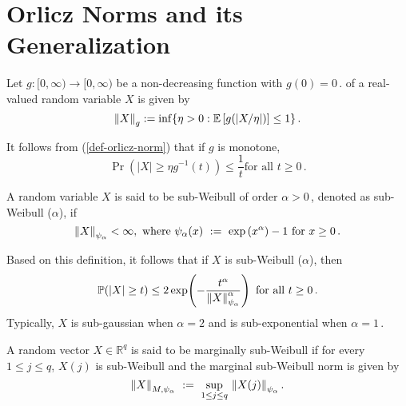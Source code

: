 \documentclass[12pt]{article}
\begin{document}
\section{Orlicz Norms and its Generalization}
\begin{definition}
  Let $g:[0, \infty) \rightarrow [0, \infty)$ be a non-decreasing function
  with $g(0) = 0\,.$ of a real-valued random variable $X$ is given by
  \begin{equation}\label{def-orlicz-norm}
    \left\lVert X \right\rVert_g := \inf\{\eta > 0: \mathbb{E}\left[g(\vert X /\eta
    \vert) \right] \le 1\}\,.
  \end{equation}
\end{definition}

It follows from (\ref{def-orlicz-norm}) that if $g$ is monotone,
\begin{equation} \nonumber
  \Pr\!\left(\vert X \vert \ge \eta g^{-1}(t) \right) \le \dfrac{1}{t} \text{
  for all } t \ge 0\,.
\end{equation}

\begin{definition}
  A random variable $X$ is said to be sub-Weibull of order $\alpha > 0\,$,
  denoted as sub-Weibull ($\alpha$), if
  \begin{equation} \label{def-sub-weibull}
    \left\lVert X\right\rVert_{\psi_\alpha} < \infty, \text{ where } \psi_\alpha(x) ~:=~
    \exp\left(x^\alpha \right) - 1 \text{  for } x \ge 0\,.
  \end{equation}
\end{definition}
Based on this definition, it follows that if $X$ is sub-Weibull ($\alpha$), then
\begin{equation}\nonumber
  \mathbb{P}\!\left(\vert X \vert \ge t \right) \le 2 \exp\!\left(-
  \dfrac{t^\alpha}{\left\lVert X\right\rVert^\alpha_{\psi_{\alpha}}} \right) \text{ for all } t
  \ge 0\,.
\end{equation}
Typically, $X$ is sub-gaussian when $\alpha = 2$ and is sub-exponential when $
\alpha = 1\,.$

\begin{definition}
  A random vector $X\in\mathbb{R}^q$ is said to be marginally sub-Weibull if for
  every $1\le j\le q$, $X(j)$ is sub-Weibull and the marginal sub-Weibull norm
  is given by
  \[
  \left\lVert X\right\rVert_{M,\psi_{\alpha}} ~:=~ \sup_{1\le j\le q}\,\left\lVert X(j)\right\rVert_{\psi_{\alpha}}.
  \]
\end{definition}
\end{document}
